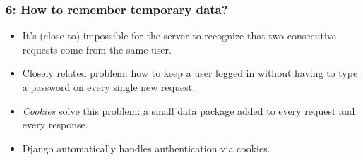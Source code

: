 \documentclass{beamer}
\begin{document}
\begin{frame}
\begin{center}
  \end{center}
\end{frame}

\begin{frame}
  \frametitle{6: How to remember temporary data?}

  \begin{itemize}
  \item It's (close to) impossible for the server to recognize that
    two consecutive requests come from the same user.
  \item Closely related problem: how to keep a user logged in without
    having to type a password on every single new request.
  \item \emph{Cookies} solve this problem: a small data package added
    to every request and every response.
  \item Django automatically handles authentication via cookies.
  \end{itemize}
\end{frame}
\end{document}
